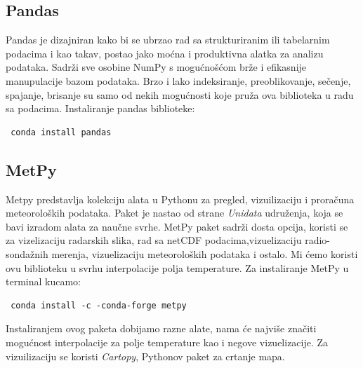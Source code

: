 \documentclass[12pt]{article}
\begin{document}
\subsection{Pandas}
Pandas je dizajniran kako bi se ubrzao rad sa strukturiranim ili tabelarnim podacima i kao takav, postao jako moćna i produktivna alatka za analizu podataka. Sadrži sve osobine NumPy s mogućnošćom brže i efikasnije manupulacije bazom podataka. Brzo i lako indeksiranje, preoblikovanje, sečenje, spajanje, brisanje su samo od nekih mogućnosti koje pruža ova biblioteka u radu sa podacima. Instaliranje pandas biblioteke:
\begin{lstlisting}
 conda install pandas
\end{lstlisting}
\subsection{MetPy}
Metpy predstavlja kolekciju alata u Pythonu za pregled, vizuilizaciju i proračuna meteoroloških podataka. Paket je nastao od strane \textsl{Unidata} udruženja, koja se bavi izradom alata za naučne svrhe. MetPy paket sadrži dosta opcija, koristi se za vizelizaciju radarskih slika, rad sa netCDF podacima,vizuelizaciju radio-sondažnih merenja, vizuelizaciju meteoroloških podataka i ostalo. Mi ćemo koristi ovu biblioteku u svrhu interpolacije polja temperature. Za instaliranje MetPy u terminal kucamo:
\begin{lstlisting}
 conda install -c -conda-forge metpy
\end{lstlisting}
Instaliranjem ovog paketa dobijamo razne alate, nama će najviše značiti mogućnost interpolacije za polje temperature kao i negove vizuelizacije. Za vizuilizaciju se koristi \textsl{Cartopy}, Pythonov paket za crtanje mapa.
\end{document}
